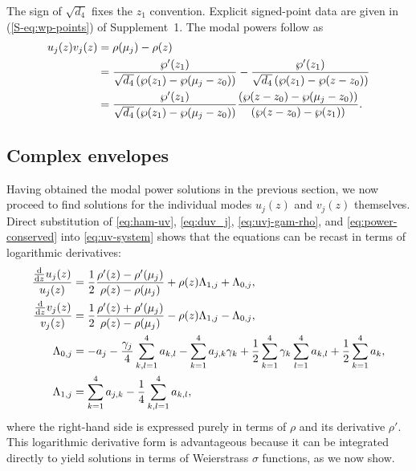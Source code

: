 \documentclass{optica-article}
\numberwithin{equation}{section}
\newcommand{\externaleqref}[1]{\textup{(\ref*{#1})}}
\begin{document}
The sign of $\sqrt{d_4}$ fixes the $z_1$ convention.
Explicit signed-point data are given in \externaleqref{S-eq:wp-points} of Supplement~1.
The modal powers follow as
\begin{align}
u_j{\left(z\right)} v_j{\left(z\right)} &= \rho(\mu_j) - \rho(z) \notag \\
&= \frac{\wp'{\left(z_{1}\right)}}{ \sqrt{{d}_{4}} \left(\wp{\left(z_{1}\right)} - \wp{\left({\mu}_{j} - z_{0}\right)}\right)} - \frac{\wp'{\left(z_{1}\right)}}{\sqrt{{d}_{4}} \left(\wp{\left(z_{1}\right)} - \wp{\left(z - z_{0}\right)}\right) } \notag \\
&= \frac{\wp'{\left(z_{1}\right)} }{ \sqrt{{d}_{4}} \left(\wp{\left(z_{1}\right)} - \wp{\left({\mu}_{j}- z_{0}\right)}\right)} \frac{ \left(\wp{\left(z - z_{0}\right)} - \wp{\left({\mu}_{j} - z_{0}\right)}\right) }{ \left(\wp{\left(z - z_{0}\right)} - \wp{\left(z_{1}\right)}\right) }. \label{eq:uv-wp}
\end{align}


\subsection{Complex envelopes} \label{sec:mode-sols-u-v}

Having obtained the modal power solutions in the previous section, we now proceed to find solutions for the individual modes $u_j(z)$ and $v_j(z)$ themselves.
Direct substitution of \eqref{eq:ham-uv}, \eqref{eq:duv_j}, \eqref{eq:uvj-gam-rho}, and \eqref{eq:power-conserved} into \eqref{eq:uv-system} shows that the equations can be recast in terms of logarithmic derivatives:
\begin{align}
\frac{\frac{\mathrm{d}}{\mathrm{d}z} u_j{\left(z\right)}}{u_j{\left(z\right)}} &= \frac{1}{2}\frac{\rho'{\left(z \right)} - \rho'{\left({\mu}_{j} \right)}}{\rho{\left(z \right)} - \rho{\left({\mu}_{j} \right)}} + \rho{\left(z \right)} {\Lambda}_{1,j} + {\Lambda}_{0,j}, \notag \\
\frac{\frac{\mathrm{d}}{\mathrm{d}z} v_j{\left(z\right)}}{v_j{\left(z\right)}} &= \frac{1}{2}\frac{\rho'{\left(z \right)} + \rho'{\left({\mu}_{j} \right)}}{\rho{\left(z \right)} - \rho{\left({\mu}_{j} \right)}} - \rho{\left(z \right)} {\Lambda}_{1,j} - {\Lambda}_{0,j}, \label{eq:dlog-u-v-rho} \\
{\Lambda}_{0,j} &= - {a}_{j} - \frac{{\gamma}_{j}}{4} \sum\limits_{k,l=1}^{4} {a}_{k,l} - \sum_{k=1}^{4} {a}_{j,k} {\gamma}_{k} + \frac{1}{2}\sum_{k=1}^{4} {\gamma}_{k} \sum_{l=1}^{4} {a}_{k,l} + \frac{1}{2}\sum_{k=1}^{4} {a}_{k}, \\
{\Lambda}_{1,j} &= \sum_{k=1}^{4} {a}_{j,k} - \frac{1}{4}\sum\limits_{k,l=1}^{4}  {a}_{k,l},
\end{align}
where the right-hand side is expressed purely in terms of $\rho$ and its derivative $\rho'$.
This logarithmic derivative form is advantageous because it can be integrated directly to yield solutions in terms of Weierstrass $\sigma$ functions, as we now show.
\end{document}
